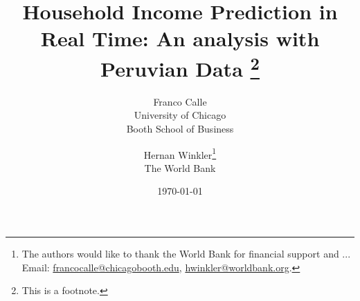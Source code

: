 \title{Household Income Prediction in Real Time: An analysis with Peruvian Data \footnote{This is a footnote.}}
\date{\today}
\author{
  Franco Calle \\
  \normalsize{University of Chicago}\\ 
  \normalsize{Booth School of Business}
  \and
  Hernan Winkler\thanks{The authors would like to thank the World Bank for financial support and ... \\ Email: \href{mailto:francocalle@chicagobooth.edu}{francocalle@chicagobooth.edu},
  \href{mailto:hwinkler@worldbank.org}{hwinkler@worldbank.org}.} \\
  \normalsize{The World Bank}
}
